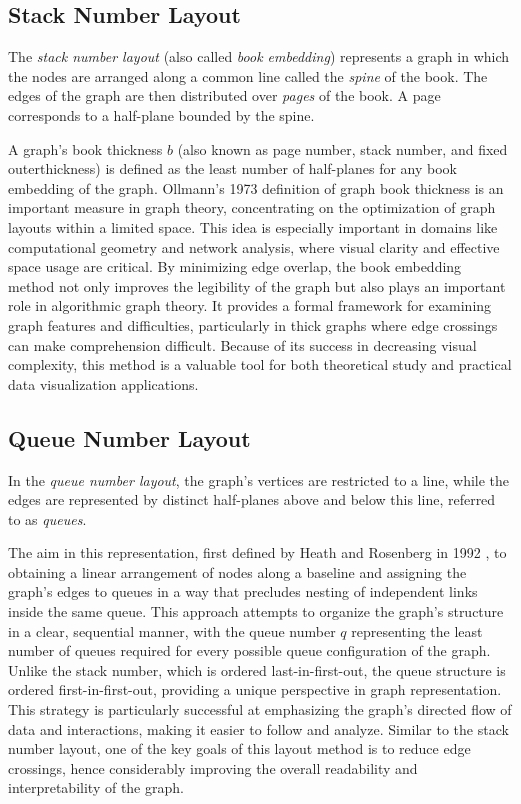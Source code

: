 \documentclass[bachelor, english]{algothesis}
\begin{document}
\subsection{Stack Number Layout}
\begin{definition}
    The \emph{stack number layout} (also called \emph{book embedding}) represents a graph in which the nodes are arranged along a common line called the \emph{spine} of the book. The edges of the graph are then distributed over \emph{pages} of the book. A page corresponds to a half-plane bounded by the spine.
\end{definition}
\noindent
A graph's book thickness $b$ (also known as page number, stack number, and fixed outerthickness) is defined as the least number of half-planes for any book embedding of the graph. Ollmann's 1973 definition \cite{book_thickness} of graph book thickness is an important measure in graph theory, concentrating on the optimization of graph layouts within a limited space. This idea is especially important in domains like computational geometry and network analysis, where visual clarity and effective space usage are critical. \newline
By minimizing edge overlap, the book embedding method not only improves the legibility of the graph but also plays an important role in algorithmic graph theory. It provides a formal framework for examining graph features and difficulties, particularly in thick graphs where edge crossings can make comprehension difficult. Because of its success in decreasing visual complexity, this method is a valuable tool for both theoretical study and practical data visualization applications.

\subsection{Queue Number Layout}
\begin{definition}
    In the \emph{queue number layout}, the graph's vertices are restricted to a line, while the edges are represented by distinct half-planes above and below this line, referred to as \emph{queues}.
\end{definition}
\noindent
The aim in this representation, first defined by Heath and Rosenberg in 1992 \cite{queue_layout}, to obtaining a linear arrangement of nodes along a baseline and assigning the graph's edges to queues in a way that precludes nesting of independent links inside the same queue. This approach attempts to organize the graph's structure in a clear, sequential manner, with the queue number $q$ representing the least number of queues required for every possible queue configuration of the graph. Unlike the stack number, which is ordered last-in-first-out, the queue structure is ordered first-in-first-out, providing a unique perspective in graph representation. This strategy is particularly successful at emphasizing the graph's directed flow of data and interactions, making it easier to follow and analyze. Similar to the stack number layout, one of the key goals of this layout method is to reduce edge crossings, hence considerably improving the overall readability and interpretability of the graph.
\end{document}
